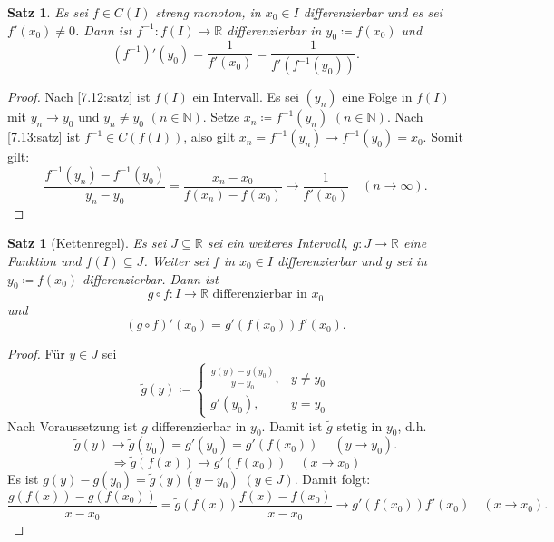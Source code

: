 \documentclass[12pt]{extreport} %
\newcommand{\N}{\mathbb{N}}
\newcommand{\R}{\mathbb{R}}
\theoremstyle{named}
\theoremstyle{itshape}
\newtheorem{satz}[unnamedtheorem]{Satz}
\theoremstyle{normal}
\begin{document}
{\begin{satz} \label{9.3:satz}
	Es sei $f \in C(I)$ streng monoton, in $x_{0} \in I$ differenzierbar und es sei $f'(x_{0}) \neq 0$. Dann ist
	$f^{-1} \colon f(I) \rightarrow \R$ differenzierbar in $y_{0} \coloneqq f(x_{0})$ und
	$$ (f^{-1})'(y_{0}) = \frac{1}{f'(x_{0})} = \frac{1}{f'(f^{-1}(y_{0}))}. $$
\end{satz}

\begin{proof} Nach \ref{7.12:satz} ist $f(I)$ ein Intervall. Es sei $(y_{n})$ eine Folge in $f(I)$ mit $y_{n} \rightarrow y_{0}$ und $y_{n} \neq y_{0}$ $(n \in \N)$. 
        Setze $x_{n} \coloneqq f^{-1}(y_{n})$ $(n \in \N)$. Nach \ref{7.13:satz} ist $f^{-1} \in C(f(I))$, also gilt $x_{n}=f^{-1}(y_{n})\rightarrow f^{-1}(y_{0})=x_{0}$. Somit gilt:
	$$ \frac{f^{-1}(y_{n}) - f^{-1}(y_{0})}{y_{n} - y_{0}} = \frac{x_{n} - x_{0}}{f(x_{n}) - f(x_{0})} \rightarrow \frac{1}{f'(x_{0})} \quad (n \to \infty). $$
\end{proof}

\begin{satz}[Kettenregel] \label{9.4:prop-Kettenregel}
	Es sei $J \subseteq \R$ sei ein weiteres Intervall, $g \colon J \rightarrow \R$ eine Funktion und $f(I) \subseteq J$. Weiter sei $f$ in $x_{0} \in I$ differenzierbar 
	und $g$ sei in $y_{0} \coloneqq f(x_{0})$ differenzierbar. Dann ist
		$$ g \circ f \colon I \rightarrow \R \text{ differenzierbar in } x_{0} $$
		und
		$$ (g \circ f)'(x_{0}) = g'(f(x_{0})) f'(x_{0}). $$
\end{satz}

\begin{proof}
	Für $y \in J$ sei
		$$ \tilde{g}(y) \coloneqq \begin{cases} \frac{g(y) - g(y_{0})}{y - y_{0}}, & y \neq y_{0} \\ g'(y_{0}), & y = y_{0} \end{cases} $$
	Nach Voraussetzung ist $g$ differenzierbar in $y_{0}$. Damit ist $\tilde{g}$ stetig in $y_{0}$, d.h. 
	        $$\tilde{g}(y) \rightarrow \tilde{g}(y_{0}) = g'(y_{0}) = g'(f(x_{0})) \quad ~(y \rightarrow y_{0}).$$
		$$ \Rightarrow \tilde{g}(f(x)) \rightarrow g'(f(x_{0})) \quad (x \rightarrow x_{0}) $$
	Es ist $g(y) - g(y_{0}) = \tilde{g}(y) (y - y_{0})$ $(y \in J)$. Damit folgt:
		$$ \frac{g(f(x)) - g(f(x_{0}))}{x - x_{0}} = \tilde{g}(f(x)) \frac{f(x) - f(x_{0})}{x - x_{0}} \rightarrow g'(f(x_{0})) f'(x_{0}) \quad (x \rightarrow x_{0}). $$
\end{proof}


}
\end{document}
